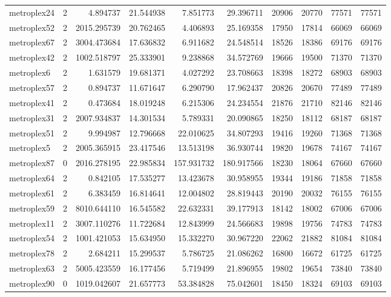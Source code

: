 \begin{longtable}{|l|r|r|r|r|r|r|r|r|r|}
metroplex24 & 2 & 4.894737 & 21.544938 & 7.851773 & 29.396711 & 20906 & 20770 & 77571 & 77571 \\
metroplex52 & 2 & 2015.295739 & 20.762465 & 4.406893 & 25.169358 & 17950 & 17814 & 66069 & 66069 \\
metroplex67 & 2 & 3004.473684 & 17.636832 & 6.911682 & 24.548514 & 18526 & 18386 & 69176 & 69176 \\
metroplex42 & 2 & 1002.518797 & 25.333901 & 9.238868 & 34.572769 & 19666 & 19500 & 71370 & 71370 \\
metroplex6 & 2 & 1.631579 & 19.681371 & 4.027292 & 23.708663 & 18398 & 18272 & 68903 & 68903 \\
metroplex57 & 2 & 0.894737 & 11.671647 & 6.290790 & 17.962437 & 20826 & 20670 & 77489 & 77489 \\
metroplex41 & 2 & 0.473684 & 18.019248 & 6.215306 & 24.234554 & 21876 & 21710 & 82146 & 82146 \\
metroplex31 & 2 & 2007.934837 & 14.301534 & 5.789331 & 20.090865 & 18250 & 18112 & 68187 & 68187 \\
metroplex51 & 2 & 9.994987 & 12.796668 & 22.010625 & 34.807293 & 19416 & 19260 & 71368 & 71368 \\
metroplex5 & 2 & 2005.365915 & 23.417546 & 13.513198 & 36.930744 & 19820 & 19678 & 74167 & 74167 \\
metroplex87 & 0 & 2016.278195 & 22.985834 & 157.931732 & 180.917566 & 18230 & 18064 & 67660 & 67660 \\
metroplex64 & 2 & 0.842105 & 17.535277 & 13.423678 & 30.958955 & 19344 & 19186 & 71858 & 71858 \\
metroplex61 & 2 & 6.383459 & 16.814641 & 12.004802 & 28.819443 & 20190 & 20032 & 76155 & 76155 \\
metroplex59 & 2 & 8010.644110 & 16.545582 & 22.632331 & 39.177913 & 18142 & 18002 & 67006 & 67006 \\
metroplex11 & 2 & 3007.110276 & 11.722684 & 12.843999 & 24.566683 & 19898 & 19756 & 74783 & 74783 \\
metroplex54 & 2 & 1001.421053 & 15.634950 & 15.332270 & 30.967220 & 22062 & 21882 & 81084 & 81084 \\
metroplex78 & 2 & 2.684211 & 15.299537 & 5.786725 & 21.086262 & 16800 & 16672 & 61725 & 61725 \\
metroplex63 & 2 & 5005.423559 & 16.177456 & 5.719499 & 21.896955 & 19802 & 19654 & 73840 & 73840 \\
metroplex90 & 0 & 1019.042607 & 21.657773 & 53.384828 & 75.042601 & 18450 & 18324 & 69103 & 69103 \\

\end{longtable}
